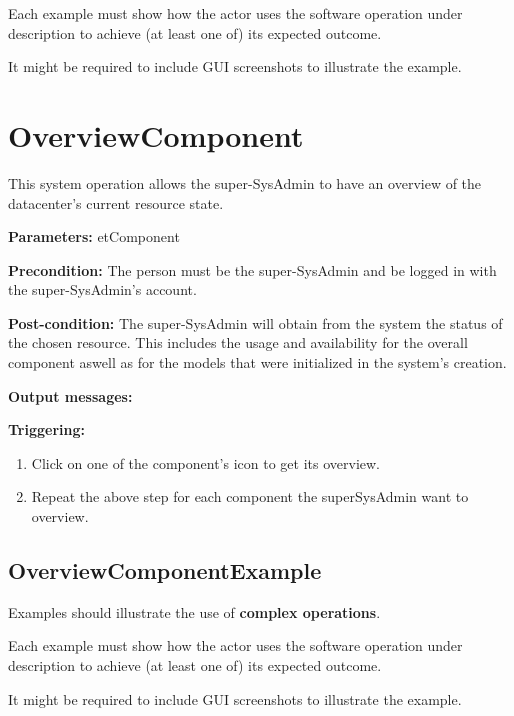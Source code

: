Each example must show how the actor uses the software operation under
description to achieve (at least one of) its expected outcome.

It might be required to include GUI screenshots to illustrate the example.



\section{OverviewComponent}
\label{operation:overviewcomponent}
This system operation allows the super-SysAdmin to have an overview of the
datacenter's current resource state.

\begin{description}

\item \textbf{Parameters:} etComponent
\item \textbf{Precondition:} The person must be the super-SysAdmin and be logged
in with the super-SysAdmin's account.
\item \textbf{Post-condition:} The super-SysAdmin will obtain from the system
the status of the chosen resource. This includes the usage and
availability for the overall component aswell as for the models that were
initialized in the system's creation.
\item \textbf{Output messages:}

\item \textbf{Triggering:}
\begin{enumerate}
\item Click on one of the component's icon to get its overview.
\item Repeat the above step for each component the superSysAdmin want to
overview.
\end{enumerate}

 
\end{description}

\subsection{OverviewComponentExample}
Examples should illustrate the use of \textbf{complex operations}.

Each example must show how the actor uses the software operation under
description to achieve (at least one of) its expected outcome.

It might be required to include GUI screenshots to illustrate the example.




